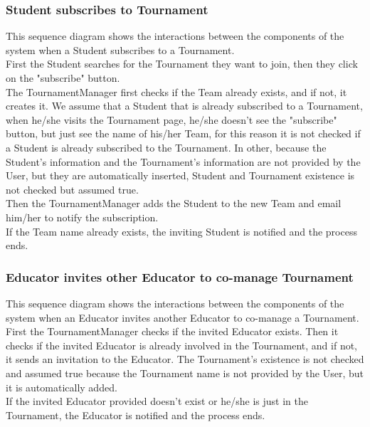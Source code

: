 \begin{landscape}
\subsubsection{Student subscribes to Tournament}
This sequence diagram shows the interactions between the components of the system when a Student subscribes to a Tournament.\\
First the Student searches for the Tournament they want to join, then they click on the "subscribe" button.\\
The TournamentManager first checks if the Team already exists, and if not, it creates it. We assume that a Student that is already subscribed to a Tournament, when he/she visits the Tournament page, he/she doesn't see the "subscribe" 
button, but just see the name of his/her Team, for this reason it is not checked if a Student is already subscribed to the Tournament. In other, because the Student's information and the Tournament's information are not provided by the 
User, but they are automatically inserted, Student and Tournament existence is not checked but assumed true.\\
Then the TournamentManager adds the Student to the new Team and email him/her to notify the subscription.\\
If the Team name already exists, the inviting Student is notified and the process ends.\\

\clearpage
\subsubsection{Educator invites other Educator to co-manage Tournament}
This sequence diagram shows the interactions between the components of the system when an Educator invites another Educator to co-manage a Tournament.\\
First the TournamentManager checks if the invited Educator exists. Then it checks if the invited Educator is already involved in the Tournament, and if not, it sends an invitation to the Educator. The Tournament's existence is not
checked and assumed true because the Tournament name is not provided by the User, but it is automatically added.\\
If the invited Educator provided doesn't exist or he/she is just in the Tournament, the Educator is notified and the process ends.\\


\end{landscape}
